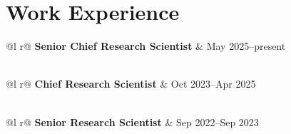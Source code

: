 \section{Work Experience}

\begin{tabularx}{\linewidth}{ @{}l r@{} }
\textbf{Senior Chief Research Scientist} & \hfill May 2025--present \\[3.75pt]
  \\
\end{tabularx}

\begin{tabularx}{\linewidth}{ @{}l r@{} }
\textbf{Chief Research Scientist} & \hfill Oct 2023--Apr 2025 \\[3.75pt]
  \\
\end{tabularx}

\begin{tabularx}{\linewidth}{ @{}l r@{} }
\textbf{Senior Research Scientist} & \hfill Sep 2022--Sep 2023 \\[3.75pt]
  \\
\end{tabularx}

